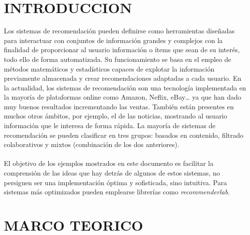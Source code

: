 \documentclass[11pt,a4paper]{article}
\begin{document}
		\section{INTRODUCCION}
		Los sistemas de recomendación pueden definirse como herramientas diseñadas para interactuar con conjuntos de información grandes y complejos con la finalidad de proporcionar al usuario información o ítems que sean de su interés, todo ello de forma automatizada. Su funcionamiento se basa en el empleo de métodos matemáticos y estadísticos capaces de explotar la información previamente almacenada y crear recomendaciones adaptadas a cada usuario. En la actualidad, los sistemas de recomendación son una tecnología implementada en la mayoría de plataformas online como Amazon, Neflix, eBay… ya que han dado muy buenos resultados incrementando las ventas. También están presentes en muchos otros ámbitos, por ejemplo, el de las noticias, mostrando al usuario información que le interesa de forma rápida. La mayoría de sistemas de recomendación se pueden clasificar en tres grupos: basados en contenido, filtrado colaborativos y mixtos (combinación de los dos anteriores).\\
		\\
		El objetivo de los ejemplos mostrados en este documento es facilitar la comprensión de las ideas que hay detrás de algunos de estos sistemas, no persiguen ser una implementación óptima y sofisticada, sino intuitiva. Para sistemas más optimizados pueden emplearse librerías como \textit{recommenderlab}.
		
		\section{MARCO TEORICO}
		
\end{document}
